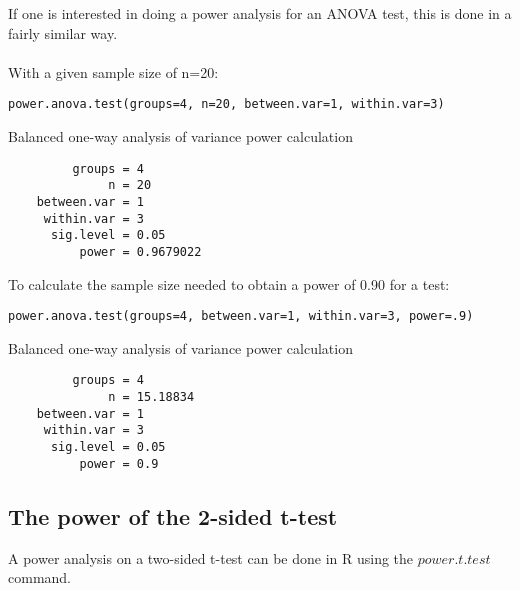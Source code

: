 \documentclass[12pt,a4paper]{article}
\theoremstyle{regla}
\theoremstyle{remark}
\theoremstyle{definition}
\theoremstyle{nonumberbreak}
\begin{document}
\begin{xmpl}
If one is interested in doing a power analysis for an ANOVA test, this is done in a fairly similar way.\\~\\
With a given sample size of n=20:
\begin{lstlisting}
power.anova.test(groups=4, n=20, between.var=1, within.var=3)
\end{lstlisting}
  Balanced one-way analysis of variance power calculation 
\begin{lstlisting}
         groups = 4
              n = 20
    between.var = 1
     within.var = 3
      sig.level = 0.05
          power = 0.9679022

\end{lstlisting}

To calculate the sample size needed to obtain a power of 0.90 for a test:

\begin{lstlisting}
power.anova.test(groups=4, between.var=1, within.var=3, power=.9) 
\end{lstlisting}
Balanced one-way analysis of variance power calculation 
\begin{lstlisting}
         groups = 4
              n = 15.18834
    between.var = 1
     within.var = 3
      sig.level = 0.05
          power = 0.9
\end{lstlisting}
\end{xmpl}

\subsection{The power of the 2-sided t-test}
\begin{fbox}
\begin{minipage}{0.97\textwidth}
A power analysis on a two-sided t-test can be done in R using the $power.t.test$ command.
\end{minipage}
\end{fbox}
\end{document}
